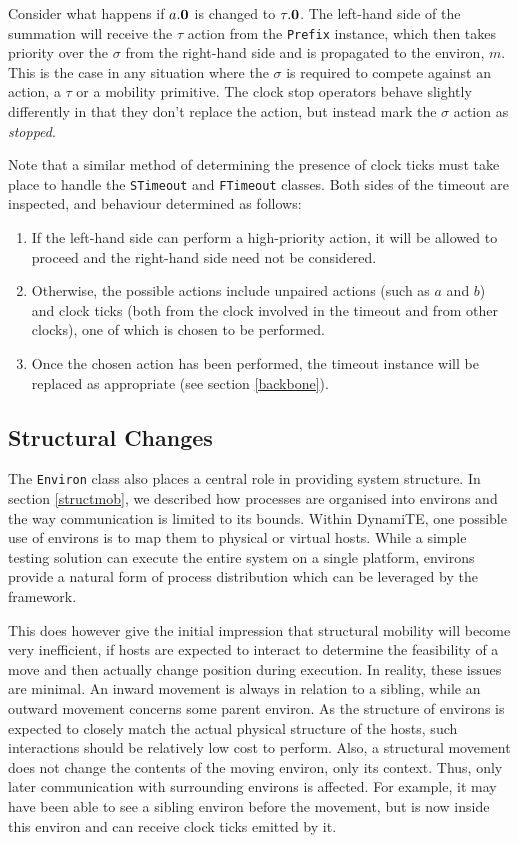 Consider what happens if $a.\textbf{0}$ is changed to $\tau.\textbf{0}$.  The
left-hand side of the summation will receive the $\tau$ action from the
\texttt{Prefix} instance, which then takes priority over the $\sigma$
from the right-hand side and is propagated to the environ, $m$.  This is
the case in any situation where the $\sigma$ is required to compete
against an action, a $\tau$ or a mobility primitive.  The clock stop
operators behave slightly differently in that they don't replace the
action, but instead mark the $\sigma$ action as \emph{stopped}.

Note that a similar method of determining the presence of clock ticks
must take place to handle the \texttt{STimeout} and \texttt{FTimeout}
classes.  Both sides of the timeout are inspected, and behaviour
determined as follows:
\begin{enumerate}
\item If the left-hand side can perform a high-priority action, it will
      be allowed to proceed and the right-hand side need not be
      considered.
\item Otherwise, the possible actions include unpaired actions (such as
      $a$ and $b$) and clock ticks (both from the clock involved in the
      timeout and from other clocks), one of which is chosen to be
      performed.
\item Once the chosen action has been performed, the timeout instance
      will be replaced as appropriate (see section \ref{backbone}). 
\end{enumerate}

\subsection{Structural Changes}
\label{structchange}

The \texttt{Environ} class also places a central role in providing
system structure.  In section \ref{structmob}, we described how
processes are organised into environs and the way communication is
limited to its bounds.  Within DynamiTE, one possible use of environs
is to map them to physical or virtual hosts.  While a simple testing
solution can execute the entire system on a single platform, environs
provide a natural form of process distribution which can be leveraged by
the framework.

This does however give the initial impression that structural mobility
will become very inefficient, if hosts are expected to interact to
determine the feasibility of a move and then actually change position
during execution.  In reality, these issues are minimal.  An inward
movement is always in relation to a sibling, while an outward movement
concerns some parent environ.  As the structure of environs is expected
to closely match the actual physical structure of the hosts, such
interactions should be relatively low cost to perform.  Also, a
structural movement does not change the contents of the moving environ,
only its context.  Thus, only later communication with surrounding
environs is affected.  For example, it may have been able to see a
sibling environ before the movement, but is now inside this environ and
can receive clock ticks emitted by it.

